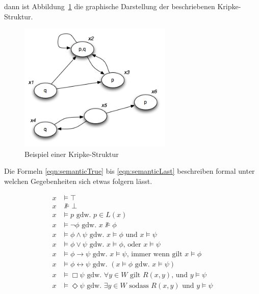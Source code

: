 dann ist Abbildung~\ref{fig:mmKripke01} die graphische Darstellung der beschriebenen Kripke-Struktur.

\begin{figure}[ht]
	\begin{center}
  	\includegraphics[width=0.65\textwidth]{./Images/Kripke01.png}
  	\caption{Beispiel einer Kripke-Struktur}
		\label{fig:mmKripke01}
	\end{center}
\end{figure}


Die Formeln \eqref{eqn:semanticTrue} bis \eqref{eqn:semanticLast} beschreiben formal unter welchen Gegebenheiten sich etwas folgern lässt.

\begin{align}
	x &\vDash \top\label{eqn:semanticTrue}\\
	x &\nVDash \bot\label{eqn:semanticFalse}\\
	x &\vDash p\text{ gdw. }p \in L(x)\\
	x &\vDash \neg \phi\text{ gdw. }x \nVDash \phi\\
	x &\vDash \phi \wedge \psi\text{ gdw. }x \vDash \phi\text{ und } x \vDash \psi\\
	x &\vDash \phi \vee \psi\text{ gdw. }x \vDash \phi \text{, oder } x \vDash \psi\\
	x &\vDash \phi \rightarrow \psi\text{ gdw. }x \vDash \psi\text{, immer wenn gilt }x \vDash \phi\\
	x &\vDash \phi \leftrightarrow \psi\text{ gdw. }( x \vDash \phi\text{ gdw. }x \vDash \psi)\\
	x &\vDash \Box \psi \text{ gdw. }\forall y \in W \text{ gilt } R(x,y)\text{, und } y \vDash \psi\\
	x &\vDash \Diamond \psi\text{ gdw. }\exists y \in W \text{ sodass }R(x,y)\text{ und }y \vDash \psi\label{eqn:semanticLast}
\end{align}




